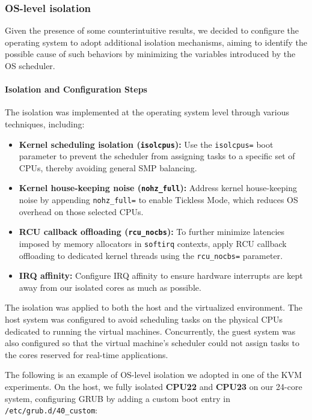 \subsubsection{OS-level isolation}\label{os-level-isolation}

Given the presence of some counterintuitive results, we decided to
configure the operating system to adopt additional isolation mechanisms,
aiming to identify the possible cause of such behaviors by minimizing
the variables introduced by the OS scheduler.

\paragraph{Isolation and Configuration
Steps}\label{isolation-and-configuration-steps}

The isolation was implemented at the operating system level through
various techniques, including:

\begin{itemize}
\item
  \textbf{Kernel scheduling isolation (\texttt{isolcpus}):} Use the
  \texttt{isolcpus=} boot parameter to prevent the scheduler from
  assigning tasks to a specific set of CPUs, thereby avoiding general
  SMP balancing.
\item
  \textbf{Kernel house-keeping noise (\texttt{nohz\_full}):} Address
  kernel house-keeping noise by appending \texttt{nohz\_full=} to enable
  Tickless Mode, which reduces OS overhead on those selected CPUs.
\item
  \textbf{RCU callback offloading (\texttt{rcu\_nocbs}):} To further
  minimize latencies imposed by memory allocators in \texttt{softirq}
  contexts, apply RCU callback offloading to dedicated kernel threads
  using the \texttt{rcu\_nocbs=} parameter.
\item
  \textbf{IRQ affinity:} Configure IRQ affinity to ensure hardware
  interrupts are kept away from our isolated cores as much as possible.
\end{itemize}

The isolation was applied to both the host and the virtualized
environment. The host system was configured to avoid scheduling tasks on
the physical CPUs dedicated to running the virtual machines.
Concurrently, the guest system was also configured so that the virtual
machine's scheduler could not assign tasks to the cores reserved for
real-time applications.

The following is an example of OS-level isolation we adopted in one of
the KVM experiments. On the host, we fully isolated \textbf{CPU22} and
\textbf{CPU23} on our 24-core system, configuring GRUB by adding a
custom boot entry in \texttt{/etc/grub.d/40\_custom}:

